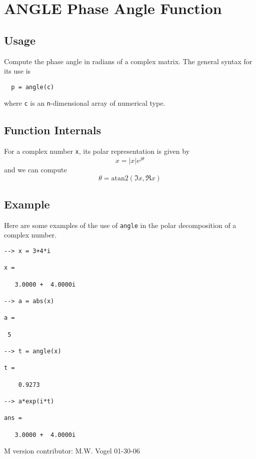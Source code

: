 \section{ANGLE Phase Angle Function
}

\subsection{Usage}

Compute the phase angle in radians of a complex matrix.  The general
syntax for its use is
\begin{verbatim}
  p = angle(c)
\end{verbatim}
where \verb|c| is an \verb|n|-dimensional array of numerical type.
\subsection{Function Internals}

For a complex number \verb|x|, its polar representation is
given by
\[
  x = |x| e^{j\theta}
\]
and we can compute 
\[
  \theta = \mathrm{atan2}(\Im x, \Re x)
\]
\subsection{Example}

Here are some examples of the use of \verb|angle| in the polar decomposition
of a complex number.
\begin{verbatim}
--> x = 3+4*i

x = 

   3.0000 +  4.0000i 

--> a = abs(x)

a = 

 5 

--> t = angle(x)

t = 

    0.9273 

--> a*exp(i*t)

ans = 

   3.0000 +  4.0000i 
\end{verbatim}
   M version contributor: M.W. Vogel 01-30-06
